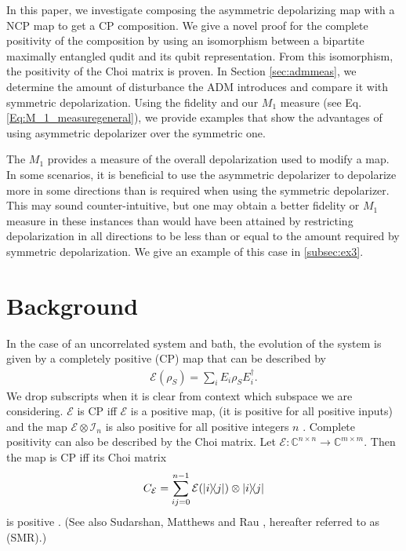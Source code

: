 \documentclass[12pt]{iopart}
\begin{document}
In this paper, we investigate composing the asymmetric depolarizing map with a NCP map to get a CP composition. We give a novel proof for the complete positivity of the composition by using an isomorphism between a bipartite maximally entangled qudit and its qubit representation. From this isomorphism, the positivity of the Choi matrix is proven. In Section \ref{sec:admmeas}, we determine the amount of disturbance the ADM introduces and compare it with symmetric depolarization. Using the fidelity and our $M_1$ measure (see Eq. \eqref{Eq:M_1_measuregeneral}), we provide examples that show the advantages of using asymmetric depolarizer over the symmetric one.

The $M_1$ provides a measure of the overall depolarization used to modify a map.  In some scenarios, it is beneficial to use the asymmetric depolarizer to depolarize more in some directions than is required when using the symmetric depolarizer. This may sound counter-intuitive, but one may obtain a better fidelity or $M_1$ measure in these instances than would have been attained by restricting depolarization in all directions to be less than or equal to the amount required by symmetric depolarization. We give an example of this case in \ref{subsec:ex3}.

\section{Background}





In the case of an uncorrelated system and bath, the evolution of the system is given by a completely positive (CP) map that can be described by \cite{Choi_1975}
\begin{align}\label{eq:osrCP}
    \mathcal{E}(\rho_S) = \sum_i E_i\rho_S E_i^\dagger.
\end{align}
We drop subscripts when it is clear from context which subspace we are considering.  $\mathcal{E}$ is CP iff $\mathcal{E}$ is a positive map, (it is positive for all positive inputs) and the map $\mathcal{E}\otimes \mathcal{I}_n$ is also positive for all positive integers $n$ \cite{Choi_1975}. Complete positivity can also be described by the Choi matrix. Let $\mathcal{E}:\mathbb{C}^{n\times n}\rightarrow \mathbb{C}^{m\times m}$. Then the map is CP iff its Choi matrix
\begin{align}
    C_\mathcal{E}=\sum_{ij=0}^{n-1}\mathcal{E}(\op{i}{j})\otimes\op{i}{j}
\end{align}
is positive \cite{Choi_1975}.  (See also Sudarshan, Matthews and Rau \cite{sudarshan_1961}, hereafter referred to as (SMR).)
\end{document}
